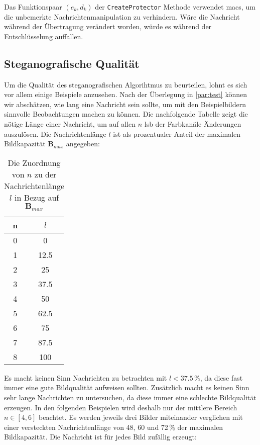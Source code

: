 \noindent
Das Funktionspaar $(e_k, d_k)$ der \texttt{CreateProtector} Methode verwendet \acp{mac},
um die unbemerkte Nachrichtenmanipulation zu verhindern. Wäre die Nachricht während der Übertragung
verändert worden, würde es während der Entschlüsselung auffallen.

\newcommand{\bmax}{\ensuremath{\mathbf{B}_{max}}}

\subsection{Steganografische Qualität}
Um die Qualität des steganografischen Algorihtmus zu beurteilen,
lohnt es sich vor allem einige
Beispiele anzusehen.
Nach der Überlegung in \autoref{par:test} können wir abschätzen,
wie lang eine Nachricht sein sollte, um mit
den Beispielbildern sinnvolle Beobachtungen machen zu können.
Die nachfolgende Tabelle
zeigt die nötige Länge einer Nachricht, um auf allen $n$ \acs{lsb}
der Farbkanäle Änderungen auszulösen.
Die Nachrichtenlänge $l$ ist als prozentualer Anteil
der maximalen Bildkapazität $\bmax$ angegeben:
\begin{table}[h]
  \centering
  \caption{Die Zuordnung von $n$ zu der Nachrichtenlänge $l$ in Bezug auf $\bmax$}
  \begin{tabular}{|c|c|}
    \hline
    n & $l$        \\ \hline
    0 & \num{0}    \\ \hline
    1 & \num{12,5} \\ \hline
    2 & \num{25}   \\ \hline
    3 & \num{37,5} \\ \hline
    4 & \num{50}   \\ \hline
    5 & \num{62,5} \\ \hline
    6 & \num{75}   \\ \hline
    7 & \num{87,5} \\ \hline
    8 & \num{100}  \\ \hline
  \end{tabular}
\end{table}

\noindent
Es macht keinen Sinn Nachrichten zu betrachten mit $l < \num{37.5}\,\%$,
da diese fast immer eine gute Bildqualität aufweisen sollten.
Zusätzlich macht es keinen Sinn sehr lange Nachrichten zu
untersuchen, da diese immer eine schlechte Bildqualität erzeugen.
In den folgenden Beispielen wird deshalb nur der mittlere Bereich $n \in [4,6]$ beachtet.
Es werden jeweils drei Bilder miteinander verglichen mit einer
versteckten Nachrichtenlänge von 48, 60 und 72\,\% der maximalen Bildkapazität.
Die Nachricht ist für jedes Bild zufällig erzeugt:

